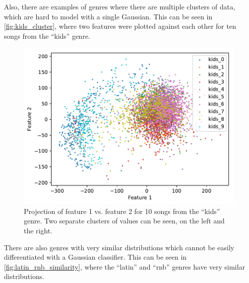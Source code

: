 \documentclass[a4paper,titlepage]{article}
\begin{document}
	Also, there are examples of genres where there are multiple clusters of data, which are hard to model with a single Gaussian. This can be seen in \autoref{fig:kids_cluster}, where two features were plotted against each other for ten songs from the ``kids'' genre.
	
	
	\begin{figure}[!htb]
		\centering
		\includegraphics[width=\columnwidth]{plots/kids_cluster.pdf}
		\caption
		{Projection of feature 1 vs. feature 2 for 10 songs from the ``kids'' genre. Two separate clusters of values can be seen, on the left and the right.}
		\label{fig:kids_cluster}
	\end{figure}

	There are also genres with very similar distributions which cannot be easily differentiated with a Gaussian classifier. This can be seen in \autoref{fig:latin_rnb_similarity}, where the ``latin'' and ``rnb'' genres have very similar distributions.
	
\end{document}
